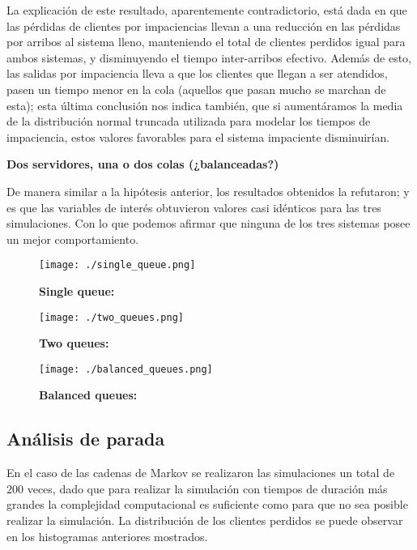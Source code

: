 \documentclass[14pt]{extarticle}
\begin{document}
La explicación de este resultado, aparentemente contradictorio, está dada en que las pérdidas de clientes por impaciencias llevan a una reducción en las pérdidas por arribos al sistema lleno, manteniendo el total de clientes perdidos igual para ambos sistemas, y disminuyendo el tiempo inter-arribos efectivo. Además de esto, las salidas por impaciencia lleva a que los clientes que llegan a ser atendidos, pasen un tiempo menor en la cola (aquellos que pasan mucho se marchan de esta); esta última conclusión nos indica también, que si aumentáramos la media de la distribución normal truncada utilizada para modelar los tiempos de impaciencia, estos valores favorables para el sistema impaciente disminuirían.

\textbf{Dos servidores, una o dos colas (¿balanceadas?)}

De manera similar a la hipótesis anterior, los resultados obtenidos la refutaron; y es que las variables de interés obtuvieron valores casi idénticos para las tres simulaciones. Con lo que podemos afirmar que ninguna de los tres sistemas posee un mejor comportamiento.

\begin{figure}[htbp]
    \centering
    \texttt{[image: ./single\_queue.png]}
   \caption{\textbf{Single queue:}}
  \end{figure}

  \begin{figure}[htbp]
    \centering
    \texttt{[image: ./two\_queues.png]}
   \caption{\textbf{Two queues:}}
  \end{figure}

  \begin{figure}[htbp]
    \centering
    \texttt{[image: ./balanced\_queues.png]}
   \caption{\textbf{Balanced queues:}}
  \end{figure}


\subsection{Análisis de parada}

En el caso de las cadenas de Markov se realizaron las simulaciones un total de $200$ veces, dado que para realizar la simulación con tiempos de duración más grandes la complejidad computacional es suficiente como para que no sea posible realizar la simulación. La distribución de los clientes perdidos se puede observar en los histogramas anteriores mostrados. 
\end{document}
